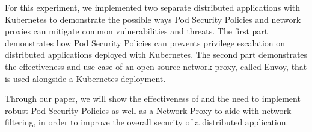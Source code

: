 For this experiment, we implemented two separate distributed applications with Kubernetes to demonstrate the 
possible ways Pod Security Policies and network proxies can mitigate common vulnerabilities and threats. 
The first part demonstrates how Pod Security Policies can prevents privilege escalation on distributed 
applications deployed with Kubernetes. The second part demonstrates the effectiveness and use case of an 
open source network proxy, called Envoy, that is used alongside a Kubernetes deployment. 

Through our paper, we will show the effectiveness of and the need to implement robust Pod Security Policies
as well as a Network Proxy to aide with network filtering, in order to improve the overall security of a
distributed application. 
